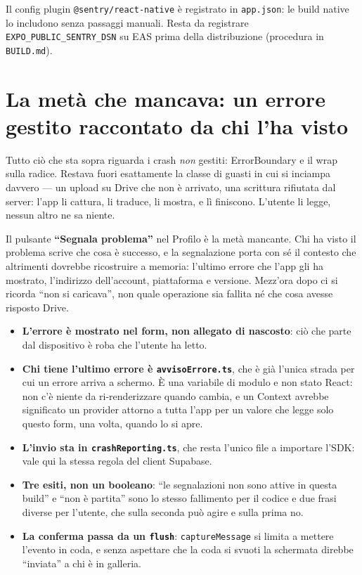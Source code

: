 \documentclass[11pt,a4paper]{report}
\begin{document}
Il config plugin \texttt{@sentry/react-native} \`e registrato in
\texttt{app.json}: le build native lo includono senza passaggi manuali. Resta
da registrare \texttt{EXPO\_PUBLIC\_SENTRY\_DSN} su EAS prima della
distribuzione (procedura in \texttt{BUILD.md}).

\section{La met\`a che mancava: un errore gestito raccontato da chi l'ha visto}

Tutto ci\`o che sta sopra riguarda i crash \emph{non} gestiti: ErrorBoundary e
il wrap sulla radice. Restava fuori esattamente la classe di guasti in cui si
inciampa davvero --- un upload su Drive che non \`e arrivato, una scrittura
rifiutata dal server: l'app li cattura, li traduce, li mostra, e l\`i
finiscono. L'utente li legge, nessun altro ne sa niente.

Il pulsante \textbf{``Segnala problema''} nel Profilo \`e la met\`a mancante.
Chi ha visto il problema scrive che cosa \`e successo, e la segnalazione porta
con s\'e il contesto che altrimenti dovrebbe ricostruire a memoria: l'ultimo
errore che l'app gli ha mostrato, l'indirizzo dell'account, piattaforma e
versione. Mezz'ora dopo ci si ricorda ``non si caricava'', non quale operazione
sia fallita n\'e che cosa avesse risposto Drive.

\begin{itemize}[nosep]
  \item \textbf{L'errore \`e mostrato nel form, non allegato di nascosto}: ci\`o
        che parte dal dispositivo \`e roba che l'utente ha letto.
  \item \textbf{Chi tiene l'ultimo errore \`e \texttt{avvisoErrore.ts}}, che \`e
        gi\`a l'unica strada per cui un errore arriva a schermo. \`E una
        variabile di modulo e non stato React: non c'\`e niente da
        ri-renderizzare quando cambia, e un Context avrebbe significato un
        provider attorno a tutta l'app per un valore che legge solo questo
        form, una volta, quando lo si apre.
  \item \textbf{L'invio sta in \texttt{crashReporting.ts}}, che resta l'unico
        file a importare l'SDK: vale qui la stessa regola del client Supabase.
  \item \textbf{Tre esiti, non un booleano}: ``le segnalazioni non sono attive
        in questa build'' e ``non \`e partita'' sono lo stesso fallimento per il
        codice e due frasi diverse per l'utente, che sulla seconda pu\`o agire e
        sulla prima no.
  \item \textbf{La conferma passa da un \texttt{flush}}: \texttt{captureMessage}
        si limita a mettere l'evento in coda, e senza aspettare che la coda si
        svuoti la schermata direbbe ``inviata'' a chi \`e in galleria.
\end{itemize}
\end{document}
